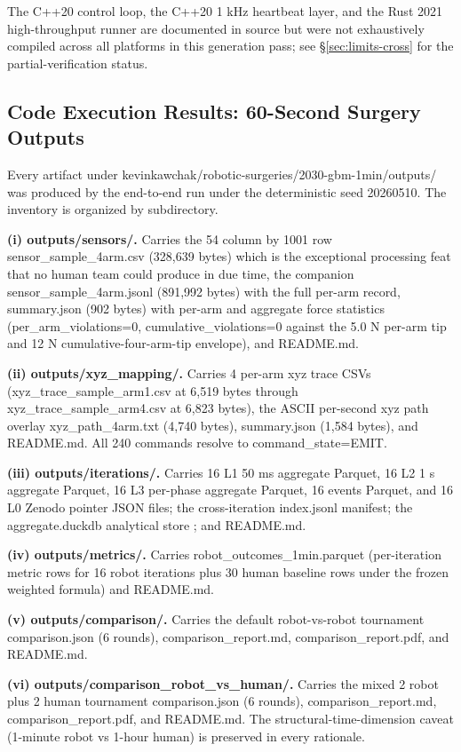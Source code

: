 The C++20 control loop, the C++20 1 kHz heartbeat layer, and the
Rust 2021 high-throughput runner are documented in source but were
not exhaustively compiled across all platforms in this generation
pass; see \S\ref{sec:limits-cross} for the partial-verification
status.

\subsection{Code Execution Results: 60-Second Surgery Outputs}
\label{sec:results-execution}

Every artifact under
kevinkawchak/robotic-surgeries/2030-gbm-1min/outputs/ was produced
by the end-to-end run under the deterministic seed 20260510. The
inventory is organized by subdirectory.

\textbf{(i) outputs/sensors/.} Carries the 54 column by 1001 row
sensor_sample_4arm.csv (328,639 bytes) which is the exceptional
processing feat that no human team could produce in due time, the
companion sensor_sample_4arm.jsonl (891,992 bytes) with the full
per-arm record, summary.json (902 bytes) with per-arm and aggregate
force statistics (per_arm_violations=0, cumulative_violations=0
against the 5.0 N per-arm tip and 12 N cumulative-four-arm-tip
envelope), and README.md.

\textbf{(ii) outputs/xyz_mapping/.} Carries 4 per-arm xyz trace CSVs
(xyz_trace_sample_arm1.csv at 6,519 bytes through
xyz_trace_sample_arm4.csv at 6,823 bytes), the ASCII per-second xyz
path overlay xyz_path_4arm.txt (4,740 bytes), summary.json
(1,584 bytes), and README.md. All 240 commands resolve to
command_state=EMIT.

\textbf{(iii) outputs/iterations/.} Carries 16 L1 50 ms aggregate
Parquet, 16 L2 1 s aggregate Parquet, 16 L3 per-phase aggregate
Parquet, 16 events Parquet, and 16 L0 Zenodo pointer JSON files;
the cross-iteration index.jsonl manifest; the aggregate.duckdb
analytical store \cite{apache-arrow, duckdb}; and README.md.

\textbf{(iv) outputs/metrics/.} Carries robot_outcomes_1min.parquet
(per-iteration metric rows for 16 robot iterations plus 30 human
baseline rows under the frozen weighted formula) and README.md.

\textbf{(v) outputs/comparison/.} Carries the default robot-vs-robot
tournament comparison.json (6 rounds), comparison_report.md,
comparison_report.pdf, and README.md.

\textbf{(vi) outputs/comparison_robot_vs_human/.} Carries the mixed
2 robot plus 2 human tournament comparison.json (6 rounds),
comparison_report.md, comparison_report.pdf, and README.md. The
structural-time-dimension caveat (1-minute robot vs 1-hour human) is
preserved in every rationale.

